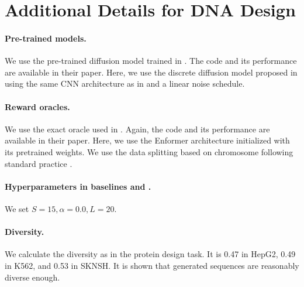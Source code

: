 \section{Additional Details for DNA Design}\label{sec:appendix}


\paragraph{Pre-trained models.} We use the pre-trained diffusion model trained in \citet{wang2024finetuning}. The code and its performance are available in their paper. Here, we use the discrete diffusion model proposed in \citep{sahoo2024simple} using the same CNN architecture as in \citep{stark2024dirichlet} and a linear noise schedule. 

\paragraph{Reward oracles.} We use the exact oracle used in \citet{wang2024finetuning}. Again, the code and its performance are available in their paper. Here, we use the Enformer architecture \citep{avsec2021effective} initialized with its pretrained weights. We use the data splitting based on chromosome following standard practice \citep{lal2024reglm}.  

\paragraph{Hyperparameters in baselines and \alg.} We set $S=15,\alpha =0.0, L = 20$. 

\paragraph{Diversity.} We calculate the diversity as in the protein design task. It is 0.47 in HepG2, 0.49 in K562, and 0.53 in SKNSH. It is shown that generated sequences are reasonably diverse enough. 


